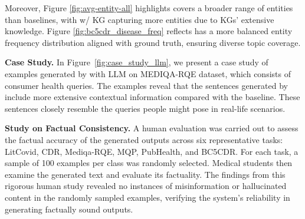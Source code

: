Moreover, Figure \ref{fig:avg-entity-all} highlights {\ours} covers a broader range of entities than baselines, with {\ours} w/ KG capturing more entities due to KGs' extensive knowledge. Figure \ref{fig:bc5cdr_disease_freq} reflects {\ours} has a more balanced entity frequency distribution aligned with ground truth, ensuring diverse topic coverage.

\begin{table*}[t]
  \caption{The average cost (in US dollars) of running {\ours} on various datasets per 1000 samples, compared with prompting GPT-3.5 for inference and DemoGen.}
  \label{tab:money_cost}
  \vspace{-1ex}
\end{table*}

\noindent \textbf{Case Study.}
In Figure~\ref{fig:case_study_llm}, we present a case study of examples generated by {\ours} with LLM on MEDIQA-RQE dataset, which consists of consumer health queries. The examples reveal that the sentences generated by {\ours} include more extensive contextual information compared with the baseline. These sentences closely resemble the queries people might pose in real-life scenarios.

\noindent \textbf{Study on Factual Consistency.} 
A human evaluation was carried out to assess the factual accuracy of the generated outputs across six representative tasks: LitCovid, CDR, Mediqa-RQE, MQP, PubHealth, and BC5CDR. For each task, a sample of 100 examples per class was randomly selected. Medical students then examine the generated text and evaluate its factuality. The findings from this rigorous human study revealed no instances of misinformation or hallucinated content in the randomly sampled examples, verifying the system's reliability in generating factually sound outputs.

